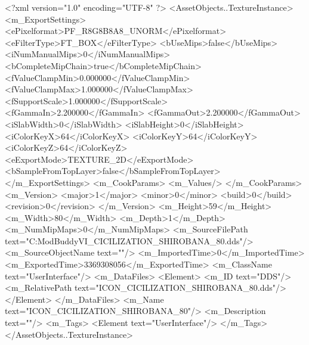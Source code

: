 <?xml version="1.0" encoding="UTF-8" ?>
<AssetObjects..TextureInstance>
	<m_ExportSettings>
		<ePixelformat>PF_R8G8B8A8_UNORM</ePixelformat>
		<eFilterType>FT_BOX</eFilterType>
		<bUseMips>false</bUseMips>
		<iNumManualMips>0</iNumManualMips>
		<bCompleteMipChain>true</bCompleteMipChain>
		<fValueClampMin>0.000000</fValueClampMin>
		<fValueClampMax>1.000000</fValueClampMax>
		<fSupportScale>1.000000</fSupportScale>
		<fGammaIn>2.200000</fGammaIn>
		<fGammaOut>2.200000</fGammaOut>
		<iSlabWidth>0</iSlabWidth>
		<iSlabHeight>0</iSlabHeight>
		<iColorKeyX>64</iColorKeyX>
		<iColorKeyY>64</iColorKeyY>
		<iColorKeyZ>64</iColorKeyZ>
		<eExportMode>TEXTURE_2D</eExportMode>
		<bSampleFromTopLayer>false</bSampleFromTopLayer>
	</m_ExportSettings>
	<m_CookParams>
		<m_Values/>
	</m_CookParams>
	<m_Version>
		<major>1</major>
		<minor>0</minor>
		<build>0</build>
		<revision>0</revision>
	</m_Version>
	<m_Height>59</m_Height>
	<m_Width>80</m_Width>
	<m_Depth>1</m_Depth>
	<m_NumMipMaps>0</m_NumMipMaps>
	<m_SourceFilePath text="C:\Users\asus\Documents\Firaxis ModBuddy\Civilization VI\temppic\ICON_CICILIZATION_SHIROBANA_80.dds"/>
	<m_SourceObjectName text=""/>
	<m_ImportedTime>0</m_ImportedTime>
	<m_ExportedTime>3369308056</m_ExportedTime>
	<m_ClassName text="UserInterface"/>
	<m_DataFiles>
		<Element>
			<m_ID text="DDS"/>
			<m_RelativePath text="ICON_CICILIZATION_SHIROBANA_80.dds"/>
		</Element>
	</m_DataFiles>
	<m_Name text="ICON_CICILIZATION_SHIROBANA_80"/>
	<m_Description text=""/>
	<m_Tags>
		<Element text="UserInterface"/>
	</m_Tags>
</AssetObjects..TextureInstance>

